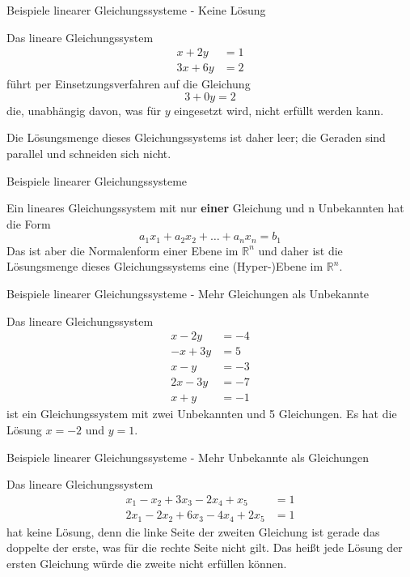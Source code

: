 \begin{frame}{Beispiele linearer Gleichungssysteme - Keine Lösung}
	\begin{example}
		Das lineare Gleichungssystem
		\begin{align*}
		x + 2 y & = 1 \\
		3 x +  6 y & = 2
		\end{align*}
		führt per Einsetzungsverfahren auf die Gleichung
		\[
		3  + 0 y= 2
		\]
		die, unabhängig davon, was für $y$ eingesetzt wird, nicht erfüllt werden kann.
		
		Die Lösungsmenge dieses Gleichungssystems ist daher leer; die Geraden sind parallel und schneiden sich nicht.
	\end{example}
\end{frame}

\begin{frame}{Beispiele linearer Gleichungssysteme}

	\begin{example}
	Ein lineares Gleichungssystem mit nur \textbf{einer} Gleichung und n Unbekannten hat die Form
	\[
		a_1 x_1 + a_2 x_2 + \ldots + a_n x_n = b_1
	\]
	Das ist aber die Normalenform einer Ebene im $\mathbb{R}^n$ und daher ist die Lösungsmenge dieses Gleichungssystems eine (Hyper-)Ebene im $\mathbb{R}^n$.		
	\end{example}
\end{frame}

\begin{frame}{Beispiele linearer Gleichungssysteme - Mehr Gleichungen als Unbekannte}
	\begin{example}
	Das lineare Gleichungssystem
	\begin{align*}
	x - 2 y & = -4 \\
	-x + 3 y & = 5 \\
	x - y & = -3 \\
	2 x - 3 y & = -7 \\
	x + y & = -1
	\end{align*}		
	ist ein Gleichungssystem mit zwei Unbekannten und 5 Gleichungen. Es hat die Lösung $x = -2$ und $y = 1$.
	\end{example}

\end{frame}

\begin{frame}{Beispiele linearer Gleichungssysteme - Mehr Unbekannte als Gleichungen}
	\begin{example}
		Das lineare Gleichungssystem
		\begin{align*}
		x_1 - x_2 + 3 x_3 -2 x_4 + x_5 & = 1 \\
		2 x_1 -2 x_2 + 6x_3 -4 x_4 +2x_5 & = 1
		\end{align*}
		hat keine Lösung, denn die linke Seite der zweiten Gleichung ist gerade das doppelte der erste, was für die rechte Seite nicht gilt. Das heißt jede Lösung der ersten Gleichung würde die zweite nicht erfüllen können.
	\end{example}
\end{frame}


